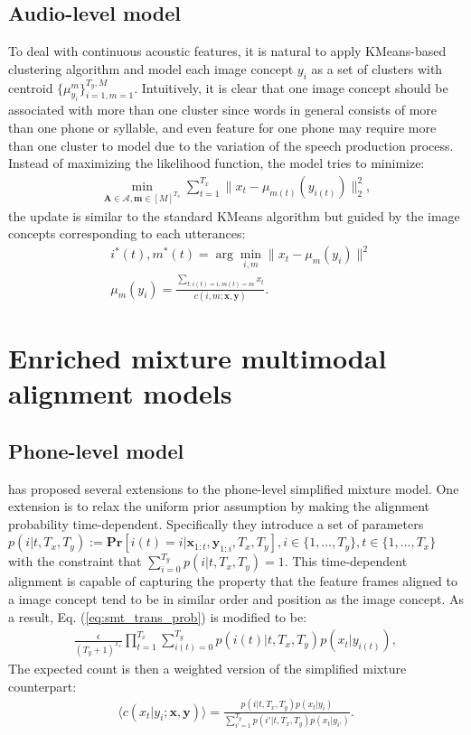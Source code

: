 \documentclass[journal]{IEEEtran}
\begin{document}
\subsection{Audio-level model}
To deal with continuous acoustic features, it is natural to apply
KMeans-based clustering algorithm and model each image concept $y_i$ as a set of clusters with centroid $\{\mu_{y_i}^m\}_{i=1, m=1}^{T_y, M}$. Intuitively, it is clear that one image concept should be associated with more than one cluster since words in general consists of more than one phone or syllable, and even feature for one phone may require more than one cluster to model due to the variation of the speech production process. Instead of maximizing the likelihood function, the model tries to minimize:
\begin{align}\label{eq:multimodal_kmeans_obj}
    \min_{\mathbf A \in \mathcal A, \mathbf m \in [M]^{T_x}} \sum_{t=1}^{T_x} \|x_t - \mu_{m(t)}(y_{i(t)})\|^2_2,
\end{align}
the update is similar to the standard KMeans algorithm but guided by the image concepts corresponding to each utterances:
\begin{align}\label{eq:multimodal_kmeans_update}
    &i^*(t), m^*(t) = \arg\min_{i, m}\|x_t - \mu_m(y_{i})\|^2\\
    &\mu_m(y_i) = \frac{\sum_{t: i(t)=i, m(t)=m} x_t}{c(i, m;\mathbf x, \mathbf y)}.
\end{align}


\section{Enriched mixture multimodal alignment models}
\subsection{Phone-level model}
\cite{Brown92} has proposed several extensions to the phone-level simplified mixture model. One extension is to relax the uniform prior assumption by making the alignment probability time-dependent. Specifically they introduce a set of parameters $p(i|t, T_x, T_y) := \mathbf{Pr}[i(t) = i|\mathbf x_{1:t}, \mathbf y_{1:i}, T_x, T_y], i\in \{1,\ldots,T_y\}, t\in \{1,\ldots,T_x\}$ with the constraint that $\sum_{i=0}^{T_y} p(i|t, T_x, T_y) = 1$. This time-dependent alignment is capable of capturing the property that the feature frames aligned to a image concept tend to be in similar order and position as the image concept. As a result, Eq. (\ref{eq:smt_trans_prob}) is modified to be:
\begin{align}
    \frac{\epsilon}{(T_y+1)^{T_x}}\prod_{t=1}^{T_x} \sum_{i(t)=0}^{T_y}p(i(t)|t, T_x, T_y) p(x_t|y_{i(t)}),
\end{align}
The expected count is then a weighted version of the simplified mixture counterpart:
\begin{align}
\label{eq:expected_count_ibm2}
    \langle c(x_t|y_i; \mathbf x, \mathbf y) \rangle = \frac{p(i|t, T_x, T_y) p(x_t|y_i)}{\sum_{i'=1}^{T_y}p(i'|t, T_x, T_y) p(x_t|y_{i'})}.
\end{align}
\end{document}
